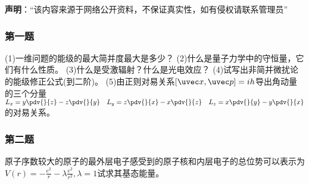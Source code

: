 


\textbf{声明}：“该内容来源于网络公开资料，不保证真实性，如有侵权请联系管理员”

\subsubsection{第一题}
(1)一维问题的能级的最大简并度最大是多少？
(2)什么是量子力学中的守恒量，它们有什么性质。
(3)什么是受激辐射？什么是光电效应？
(4)试写出非简并微扰论的能级修正公式(到二阶)。
(5)由正则对易关系$[\uvec x,\uvec p]=ih$导出角动量的三个分量$\displaystyle L_x=y\pdv{}{z}-z\pdv{}{y}  \quad L_y=z\pdv{}{x}-x\pdv{}{z} \quad L_z=x\pdv{}{y}-y\pdv{}{x}$
的对易关系。
\subsubsection{第二题}
原子序数较大的原子的最外层电子感受到的原子核和内层电子的总位势可以表示为$\displaystyle V(r)=-\frac{e^2}{r}-\lambda\frac{e^2}{r^2},\lambda=1$试求其基态能量。